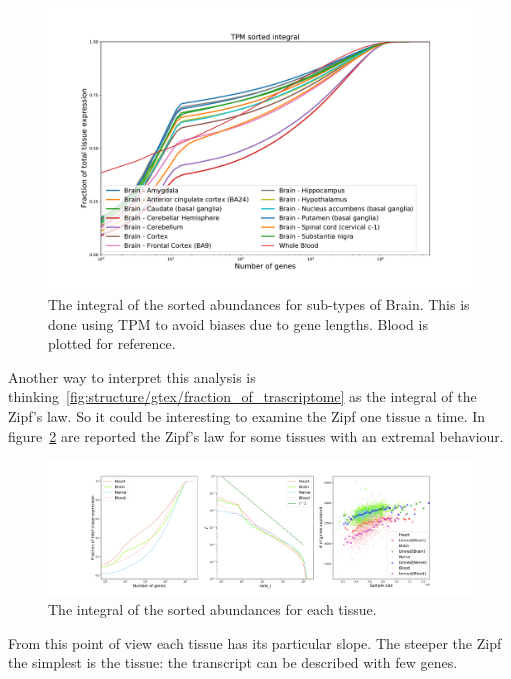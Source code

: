 \begin{figure}[htb!]
  \centering
  \includegraphics[width=0.65\linewidth]{pictures/structure/gtex/fraction_of_trascriptome_Brain.pdf}
  \caption{The integral of the sorted abundances for sub-types of Brain. This is done using TPM to avoid biases due to gene lengths. Blood is plotted for reference.}
  \label{fig:structure/gtex/fraction_of_trascriptome_Brain}
\end{figure}

Another way to interpret this analysis is thinking~\ref{fig:structure/gtex/fraction_of_trascriptome} as the integral of the Zipf's law. So it could be interesting to examine the Zipf one tissue a time. In figure~\ref{fig:structure/gtex/zipf_tissue} are reported the Zipf's law for some tissues with an extremal behaviour.
\begin{figure}[htb!]
  \centering
  \includegraphics[width=0.45\linewidth]{pictures/structure/gtex/zipf_tissue.pdf}
  \caption{The integral of the sorted abundances for each tissue.}
  \label{fig:structure/gtex/zipf_tissue}
\end{figure}
From this point of view each tissue has its particular slope. The steeper the Zipf the simplest is the tissue: the transcript can be described with few genes.

